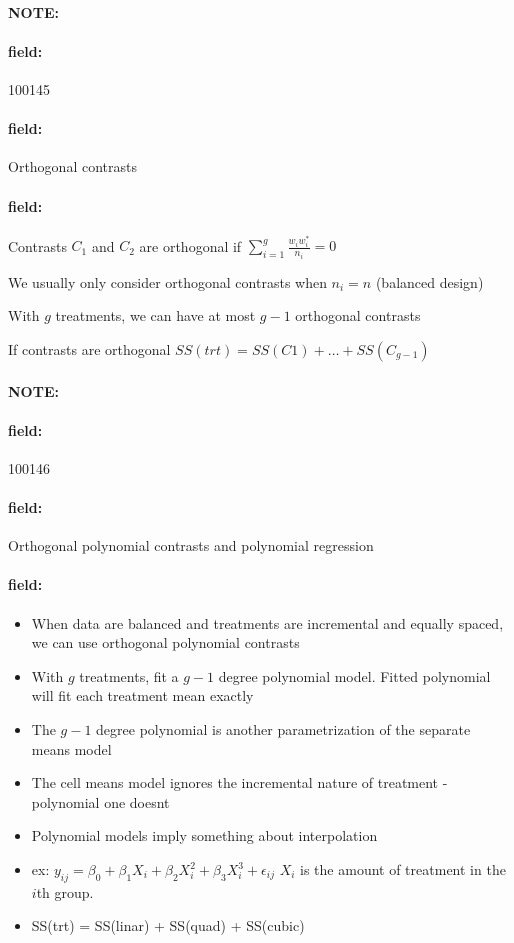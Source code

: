\documentclass[12pt]{article}
\newenvironment{note}{\paragraph{NOTE:}}{}
\newenvironment{field}{\paragraph{field:}}{}
\begin{document}
\begin{note}
    \begin{field}
        \tiny 100145
    \end{field}
    \begin{field}
        Orthogonal contrasts
    \end{field}
    \begin{field}
        Contrasts $C_1$ and $C_2$ are orthogonal if $\sum_{i=1}^g \frac{w_i w_i^*}{n_i} = 0$

        We usually only consider orthogonal contrasts when $n_i = n$ (balanced design)

        With $g$ treatments, we can have at most $g-1$ orthogonal contrasts

        If contrasts are orthogonal $SS(trt) = SS(C1) + \ldots + SS(C_{g-1})$
    \end{field}
\end{note}


\begin{note}
    \begin{field}
        \tiny 100146
    \end{field}
    \begin{field}
        Orthogonal polynomial contrasts and polynomial regression
    \end{field}
    \begin{field}
        \begin{itemize}
          \item When data are balanced and treatments are incremental and equally spaced, we can use orthogonal polynomial contrasts
          \item With $g$ treatments, fit a $g-1$ degree polynomial model. Fitted polynomial will fit each treatment mean exactly
          \item The $g-1$ degree polynomial is another parametrization of the separate means model
          \item The cell means model ignores the incremental nature of treatment - polynomial one doesnt
          \item Polynomial models imply something about interpolation
          \item ex: $y_{ij}  = \beta_0 + \beta_1 X_i + \beta_2 X_i^2 + \beta_3 X_i^3 + \epsilon_{ij}$ $X_i$ is the amount of treatment in the $i$th group.
          \item SS(trt) = SS(linar) + SS(quad) + SS(cubic)
        \end{itemize}
    \end{field}
\end{note}
\end{document}
